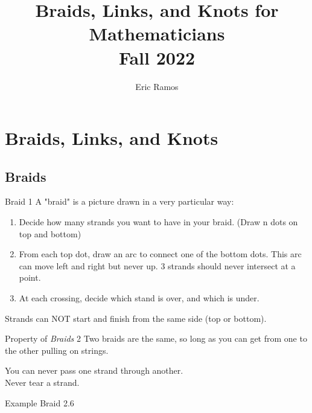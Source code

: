 \documentclass{report}
\title{\Huge{Braids, Links, and Knots for Mathematicians}\\Fall 2022}
\author{\huge{Eric Ramos}}
\date{}
\begin{document}
\maketitle
\newpage%
\pagebreak


\chapter{Braids, Links, and Knots}
\section {Braids}
\begin{definition} {Braid} { 1 }
  A "braid" is a picture drawn in a very particular way: \\
  \begin{enumerate}
    \item Decide how many strands you want to have in your braid. (Draw n dots on top and bottom) 
    \item From each top dot, draw an arc to connect one of the bottom dots. This arc can move left and right but never up. 3 strands should never intersect at a point.
    \item At each crossing, decide which stand is over, and which is under.
  \end{enumerate}
  \begin{note}
   Strands can NOT  start and finish from the same side (top or bottom). \\
  \end{note}
\end{definition}

\begin{prop} {Property of \textit{Braids}} { 2 }
  Two braids are the same, so long as you can get from one to the other pulling on strings. \\
  \begin{note} 
    You can never pass one strand through another. \\
    Never tear a strand. \\
  \end{note}
  \begin{example} {Example Braid} {2.6}
  \end{example}
\end{prop}
\end{document}
